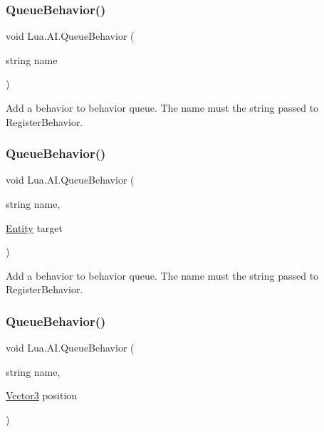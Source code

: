 \subsubsection{\texorpdfstring{QueueBehavior()}{QueueBehavior()}\hspace{0.1cm}{\footnotesize\ttfamily [1/3]}}
{\footnotesize\ttfamily void Lua.\+A\+I.\+Queue\+Behavior (\begin{DoxyParamCaption}\item[{string}]{name }\end{DoxyParamCaption})}



Add a behavior to behavior queue. The name must the string passed to Register\+Behavior. 

\mbox{\label{class_lua_1_1_a_i_af74652cc45af0d8a62bcd75caa595ea5}} 
\subsubsection{\texorpdfstring{QueueBehavior()}{QueueBehavior()}\hspace{0.1cm}{\footnotesize\ttfamily [2/3]}}
{\footnotesize\ttfamily void Lua.\+A\+I.\+Queue\+Behavior (\begin{DoxyParamCaption}\item[{string}]{name,  }\item[{\mbox{\hyperlink{class_lua_1_1_entity}{Entity}}}]{target }\end{DoxyParamCaption})}



Add a behavior to behavior queue. The name must the string passed to Register\+Behavior. 

\mbox{\label{class_lua_1_1_a_i_ad04e867b1b20eefaa0f4d60af5a9422c}} 
\subsubsection{\texorpdfstring{QueueBehavior()}{QueueBehavior()}\hspace{0.1cm}{\footnotesize\ttfamily [3/3]}}
{\footnotesize\ttfamily void Lua.\+A\+I.\+Queue\+Behavior (\begin{DoxyParamCaption}\item[{string}]{name,  }\item[{\mbox{\hyperlink{class_lua_1_1_vector3}{Vector3}}}]{position }\end{DoxyParamCaption})}



